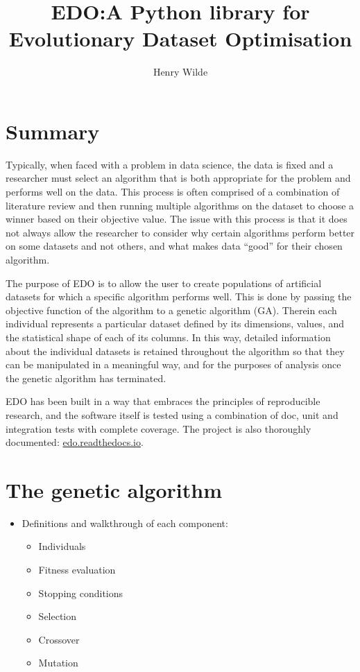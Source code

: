 \documentclass{article}
\title{EDO:\@ A Python library for Evolutionary Dataset Optimisation}
\author{Henry Wilde}
\begin{document}
\maketitle

\section{Summary}

Typically, when faced with a problem in data science, the data is fixed and a
researcher must select an algorithm that is both appropriate for the problem and
performs well on the data. This process is often comprised of a combination of
literature review and then running multiple algorithms on the dataset to choose
a winner based on their objective value. The issue with this process is that it
does not always allow the researcher to consider why certain algorithms perform
better on some datasets and not others, and what makes data ``good'' for their
chosen algorithm.

The purpose of EDO is to allow the user to create populations of artificial
datasets for which a specific algorithm performs well. This is done by passing
the objective function of the algorithm to a genetic algorithm (GA). Therein
each individual represents a particular dataset defined by its dimensions,
values, and the statistical shape of each of its columns. In this way, detailed
information about the individual datasets is retained throughout the algorithm
so that they can be manipulated in a meaningful way, and for the purposes of
analysis once the genetic algorithm has terminated.

EDO has been built in a way that embraces the principles of reproducible
research, and the software itself is tested using a combination of doc, unit and
integration tests with complete coverage. The project is also thoroughly
documented: \href{https://edo.readthedocs.io/}{edo.readthedocs.io}.


\section{The genetic algorithm}

\begin{itemize}
    \item Definitions and walkthrough of each component:
        \begin{itemize}
            \item Individuals
            \item Fitness evaluation
            \item Stopping conditions
            \item Selection
            \item Crossover
            \item Mutation
        \end{itemize}
\end{itemize}
\end{document}

